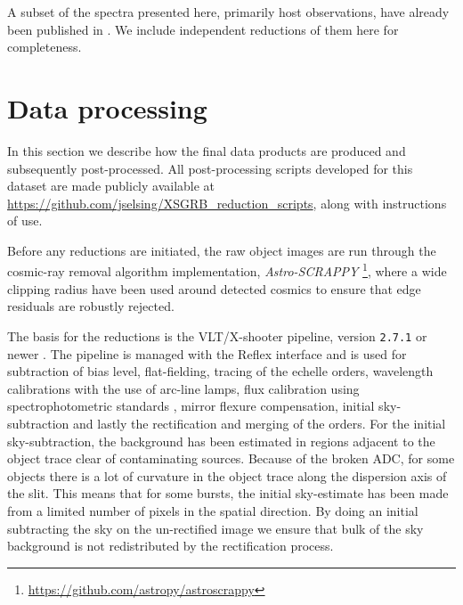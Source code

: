 \documentclass{aa}    %
\begin{document}
A subset of the spectra presented here, primarily host observations, have
already been published in \citet{Kruhler2015}. We include independent
reductions of them here for completeness.

\section{Data processing} \label{proc}

In this section we describe how the final data products are produced and
subsequently post-processed. %
All post-processing scripts developed for this dataset are made publicly
available at \url{https://github.com/jselsing/XSGRB_reduction_scripts}, along
with instructions of use.

Before any reductions are initiated, the raw object images are run through the
cosmic-ray removal algorithm \citep{VanDokkum2001} implementation,
\textit{Astro-SCRAPPY} \footnote{\url{https://github.com/astropy/astroscrappy}},
where a wide clipping radius have been used around detected cosmics to ensure that edge residuals are
robustly rejected. 

The basis for the reductions is the VLT/X-shooter pipeline, version
\texttt{2.7.1} or newer \citep{Goldoni2006, Modigliani2010}. The pipeline is
managed with the Reflex interface \citep{Freudling2013} and is used for
subtraction of bias level, flat-fielding, tracing of the echelle orders,
wavelength calibrations with the use of arc-line lamps, flux calibration using
spectrophotometric standards \citep{Vernet2010, Hamuy1994}, mirror flexure
compensation, initial sky-subtraction and lastly the rectification and merging
of the orders. For the initial sky-subtraction, the background has been
estimated in regions adjacent to the object trace clear of contaminating
sources. Because of the broken ADC, for some objects there is a lot of curvature
in the object trace along the dispersion axis of the slit. This means that for
some bursts, the initial sky-estimate has been made from a limited number of
pixels in the spatial direction. By doing an initial subtracting the sky on the
un-rectified image we ensure that bulk of the sky background is not
redistributed by the rectification process.
\end{document}
